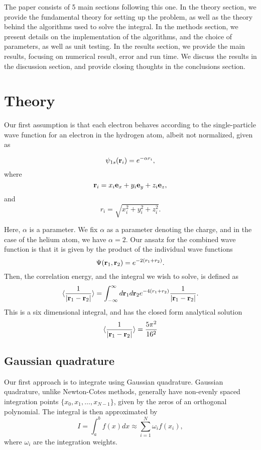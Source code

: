 \documentclass{emulateapj}
\begin{document}
The paper consists of 5 main sections following this one. In the theory section, we provide the fundamental theory for setting up the problem, as well as the theory behind the algorithms used to solve the integral. In the methods section, we present details on the implementation of the algorithms, and the choice of parameters, as well as unit testing. In the results section, we provide the main results, focusing on numerical result, error and run time. We discuss the results in the discussion section, and provide closing thoughts in the conclusions section.

\section{Theory}
\label{sec:method}
Our first assumption is that each electron behaves according to the single-particle wave function for an electron in the hydrogen atom, albeit not normalized, given as

\[
   \psi_{1s}({\bf r}_i)  =   e^{-\alpha r_i},
\]
where
\[
   {\bf r}_i =  x_i {\bf e}_x + y_i {\bf e}_y +z_i {\bf e}_z ,
\]
and
\[
r_i = \sqrt{x_i^2+y_i^2+z_i^2}.
\]

Here, $\alpha$ is a parameter. We fix $\alpha$ as a parameter denoting the charge, and in the case of the helium atom, we have $\alpha = 2$. Our ansatz for the combined wave function is that it is given by the product of the individual wave functions
\[
   \Psi({\bf r}_1,{\bf r}_2)  =   e^{-2 (r_1+r_2)}.
\]
Then, the correlation energy, and the integral we wish to solve, is defined as
\begin{equation}\label{eq:correlationenergy}
   \langle \frac{1}{|{\bf r}_1-{\bf r}_2|} \rangle =
   \int_{-\infty}^{\infty} d{\bf r}_1d{\bf r}_2  e^{-4 (r_1+r_2)}\frac{1}{|{\bf r}_1-{\bf r}_2|}.
\end{equation}
This is a six dimensional integral, and has the closed form analytical solution
\[
\langle \frac{1}{|{\bf r}_1-{\bf r}_2|} \rangle = \frac{5\pi^2}{16^2}
\]

\subsection{Gaussian quadrature}
Our first approach is to integrate using Gaussian quadrature. Gaussian quadrature, unlike Newton-Cotes methods, generally have non-evenly spaced integration points $\{x_0 , x_1 , \dots , x_{N-1}\}$, given by the zeros of an orthogonal polynomial. The integral is then approximated by
\begin{equation}
	I = \int_a^b f(x) dx \approx \sum^N_{i = 1} \omega_i f(x_i),
	\label{eq:quadrature}
\end{equation}
where $\omega_i$ are the integration weights.
\end{document}
